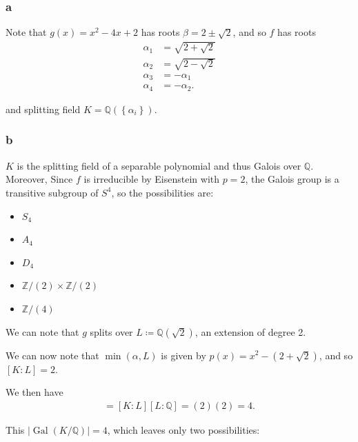 \begin{solution}

\hypertarget{a-60}{%
\subsubsection{a}\label{a-60}}

Note that \(g(x) = x^2 - 4x + 2\) has roots \(\beta = 2 \pm \sqrt{2}\),
and so \(f\) has roots
\begin{align*}
\alpha_1 &= \sqrt{2 + \sqrt 2} \\
\alpha_2 &= \sqrt{2 - \sqrt 2} \\
\alpha_3 &= -\alpha_1 \\
\alpha_4 &= -\alpha_2
.\end{align*}

and splitting field \(K = {\mathbb{Q}}(\left\{{\alpha_i}\right\})\).

\hypertarget{b-50}{%
\subsubsection{b}\label{b-50}}

\(K\) is the splitting field of a separable polynomial and thus Galois
over \({\mathbb{Q}}\). Moreover, Since \(f\) is irreducible by
Eisenstein with \(p=2\), the Galois group is a transitive subgroup of
\(S^4\), so the possibilities are:

\begin{itemize}
\tightlist
\item
  \(S_4\)
\item
  \(A_4\)
\item
  \(D_4\)
\item
  \({\mathbb{Z}}/(2) \times{\mathbb{Z}}/(2)\)
\item
  \({\mathbb{Z}}/(4)\)
\end{itemize}

We can note that \(g\) splits over \(L \coloneqq{\mathbb{Q}}(\sqrt 2)\),
an extension of degree 2.

We can now note that \(\min(\alpha, L)\) is given by
\(p(x) = x^2 - (2 + \sqrt 2)\), and so \([K: L] = 2\).

We then have
\begin{align*}
[K: {\mathbb{Q}}] = [K: L] [L : {\mathbb{Q}}] = (2)(2) = 4
.\end{align*}

This
\({\left\lvert {\operatorname{Gal}(K/{\mathbb{Q}})} \right\rvert} = 4\),
which leaves only two possibilities:


\end{solution}
